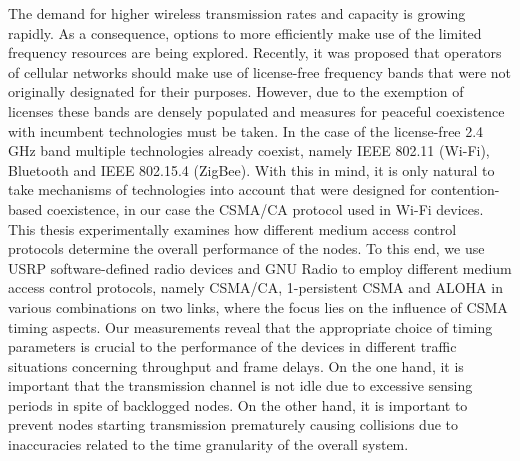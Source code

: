 The demand for higher wireless transmission rates and capacity is growing rapidly. As a consequence, options to more efficiently make use of the limited frequency resources are being explored. Recently, it was proposed that operators of cellular networks should make use of license-free frequency bands that were not originally designated for their purposes. However, due to the exemption of licenses these bands are densely populated and measures for peaceful coexistence with incumbent technologies must be taken. In the case of the license-free 2.4 GHz band multiple technologies already coexist, namely IEEE 802.11 (Wi-Fi), Bluetooth and IEEE 802.15.4 (ZigBee). With this in mind, it is only natural to take mechanisms of technologies into account that were designed for contention-based coexistence, in our case the CSMA/CA protocol used in Wi-Fi devices. 
This thesis experimentally examines how different medium access control protocols determine the overall performance of the nodes. To this end, we use USRP software-defined radio devices and GNU Radio to employ different medium access control protocols, namely CSMA/CA, 1-persistent CSMA and ALOHA in various combinations on two links, where the focus lies on the influence of CSMA timing aspects. 
Our measurements reveal that the appropriate choice of timing parameters is crucial to the performance of the devices in different traffic situations concerning throughput and frame delays. On the one hand, it is important that the transmission channel is not idle due to excessive sensing periods in spite of backlogged nodes. On the other hand, it is important to prevent nodes starting transmission prematurely causing collisions due to inaccuracies related to the time granularity of the overall system.  